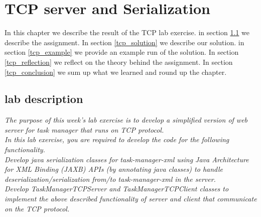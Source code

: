 \chapter{TCP server and Serialization}
\minitoc


In this chapter we describe the result of the TCP lab exercise. in section \ref{tcp_lab} we describe the assignment. In section \ref{tcp_solution} we describe our solution. in section \ref{tcp_example} we provide an example run of the solution. In section \ref{tcp_reflection} we reflect on the theory behind the assignment. In section \ref{tcp_conclusion} we sum up what we learned and round up the chapter.

\section{lab description}
\label{tcp_lab}
\textit{The purpose of this week’s lab exercise is to develop a simplified version of web server for task manager that runs on TCP protocol.}\\

\textit{In this lab exercise, you are required to develop the code for the following functionality.}\\

\textit{Develop java serialization classes for task-manager-xml using Java Architecture for XML Binding (JAXB) APIs (by annotating java classes) to handle deserialization/serialization from/to task-manager-xml in the server.}\\

\textit{Develop TaskManagerTCPServer and TaskManagerTCPClient classes to implement the above described functionality of server and client that communicate on the TCP protocol.}\\


\begin{comment}
[Optional] The server described above can only handle one single client at a time in each run. In order to make the server more robust and handle multiple clients concurrently, one may follow the approach suggested in the page. 173 of the course textbook [DS], to create a new connection for every client request that will run on a separate thread. Therefore, develop a TaskManagerTCPServer that can handle multiple concurrent clients.\\

[Optional] The functionality of TaskManagerTCPServer can be extended to offer more commands (e.g. OPTIONS, HEAD) similar to the HTTP protocol. In case of OPTIONS command, one may describe the list of commands offered by the server, where as for HEAD, one may only provide the number of tasks available for a given attendant instead of sending all the available tasks to the client.\\

\end{comment}


